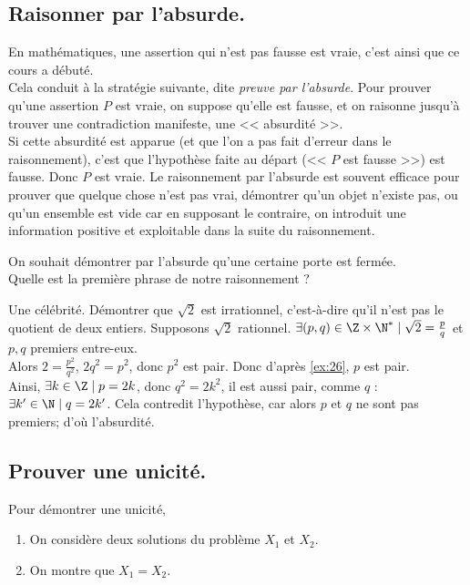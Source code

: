 \documentclass[11pt]{article}
\begin{document}
\subsection{Raisonner par l'absurde.}

En mathématiques, une assertion qui n'est pas fausse est vraie, c'est ainsi que ce cours a débuté.\\
Cela conduit à la stratégie suivante, dite \emph{preuve par l'absurde}. Pour prouver qu'une assertion $P$ est vraie, on suppose qu'elle est fausse, et on raisonne jusqu'à trouver une contradiction manifeste, une << absurdité >>.\\
Si cette absurdité est apparue (et que l'on a pas fait d'erreur dans le raisonnement), c'est que l'hypothèse faite au départ (<< $P$ est fausse >>) est fausse. Donc $P$ est vraie.\n
Le raisonnement par l'absurde est souvent efficace pour prouver que quelque chose n'est pas vrai, démontrer qu'un objet n'existe pas, ou qu'un ensemble est vide car en supposant le contraire, on introduit une information positive et exploitable dans la suite du raisonnement.
\vspace*{0.3cm}

\begin{ex}{}{}
    On souhait démontrer par l'absurde qu'une certaine porte est fermée.\\
    Quelle est la première phrase de notre raisonnement ?
\end{ex}

\begin{ex}{Une célébrité.}{}
    Démontrer que $\sqrt{2}$ est irrationnel, c'est-à-dire qu'il n'est pas le quotient de deux entiers.
    \tcblower
    Supposons $\sqrt{2}$ rationnel. $\exists (p,q)\in \Z\times\N^* \mid \sqrt{2}=\frac{p}{q}$ et $p,q$ premiers entre-eux.\\
    Alors $2=\frac{p^2}{q^2}$, $2q^2=p^2$, donc $p^2$ est pair. Donc d'après \ref{ex:26}, $p$ est pair.\\
    Ainsi, $\exists k\in\Z\mid p=2k$, donc $q^2=2k^2$, il est aussi pair, comme $q$ : $\exists k'\in\N\mid q=2k'$.\n
    Cela contredit l'hypothèse, car alors $p$ et $q$ ne sont pas premiers; d'où l'absurdité.
\end{ex}

\subsection{Prouver une unicité.}

\begin{meth}{}{}
    Pour démontrer une unicité,
    \begin{enumerate}[topsep=0pt,itemsep=-0.9 ex]
        \item On considère deux solutions du problème $X_1$ et $X_2$.
        \item On montre que $X_1=X_2$.
    \end{enumerate}
\end{meth}
\end{document}

